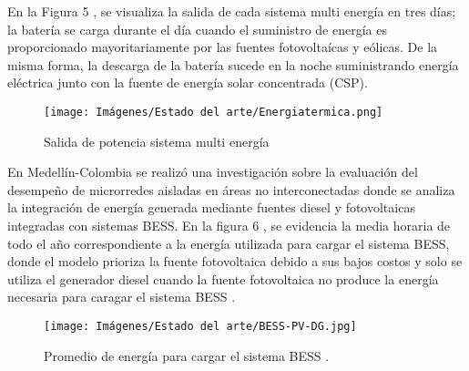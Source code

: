 En la Figura 5 , se visualiza la salida de cada sistema multi energía en tres días; la batería se carga durante el día cuando el suministro de energía es  proporcionado mayoritariamente por las fuentes fotovoltaícas y eólicas. De la misma forma, la descarga de la batería sucede en la noche suministrando energía eléctrica  junto con la fuente de energía solar concentrada (CSP).
\begin{figure}[h!]
    \begin{center}
    \centering
\texttt{[image: Imágenes/Estado del arte/Energiatermica.png]}
	\caption{Salida de potencia sistema multi energía
	\cite{li2019capacity}}
    \end{center}
\end{figure}
\newline
En Medellín-Colombia se realizó una investigación sobre la evaluación del desempeño de microrredes aisladas en áreas no interconectadas donde se analiza la integración de energía generada mediante fuentes diesel y fotovoltaicas integradas con sistemas BESS. En la figura 6 , se evidencia la media horaria de todo el año correspondiente a la energía utilizada para cargar el sistema BESS, donde el modelo prioriza la fuente fotovoltaica debido a sus bajos costos y solo se utiliza el generador diesel cuando la fuente fotovoltaica no produce la energía necesaria para caragar el sistema BESS \cite{ropero2022sizing}.
\newpage
\begin{figure}[h!]
    \begin{center}
    \centering
\texttt{[image: Imágenes/Estado del arte/BESS-PV-DG.jpg]}
	\caption{Promedio de energía para cargar el sistema BESS \cite{ropero2022sizing}.}
    \end{center}
\end{figure}

\smallskip


